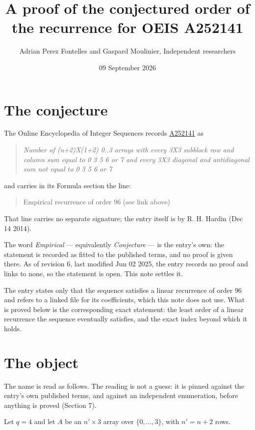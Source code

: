 \documentclass[11pt]{article}
\title{A proof of the conjectured order of the recurrence for OEIS A252141}
\author{Adrian Perez Fontelles and Gaspard Moulinier, Independent researchers}
\date{09 September 2026}
\theoremstyle{definition}
\begin{document}
\maketitle
\section{The conjecture}

The Online Encyclopedia of Integer Sequences records \href{https://oeis.org/A252141}{A252141} as

\begin{quote}\itshape Number of (n+2)X(1+2) 0..3 arrays with every 3X3 subblock row and column sum equal to 0 3 5 6 or 7 and every 3X3 diagonal and antidiagonal sum not equal to 0 3 5 6 or 7\end{quote}

and carries in its Formula section the line:

\begin{quote}\ttfamily Empirical recurrence of order 96 (see link above)\end{quote}

That line carries no separate signature; the entry itself is by R. H. Hardin (Dec 14 2014).

The word {\itshape Empirical} --- equivalently {\itshape Conjecture} --- is the entry's own: the statement is recorded as fitted to the published terms, and no proof is given there. As of revision 6, last modified Jun 02 2025, the entry records no proof and links to none, so the statement is open. This note settles it.

The entry states only that the sequence satisfies a linear recurrence of order $96$ and refers to a linked file for its coefficients, which this note does not use. What is proved below is the corresponding exact statement: the least order of a linear recurrence the sequence eventually satisfies, and the exact index beyond which it holds.

\section{The object}

The name is read as follows. The reading is not a guess: it is pinned against the entry's own published terms, and against an independent enumeration, before anything is proved (Section 7).

Let $q = 4$ and let $A$ be an $n' \times 3$ array over $\{0,\dots,3\}$, with $n' = n + 2$ rows.
\end{document}
